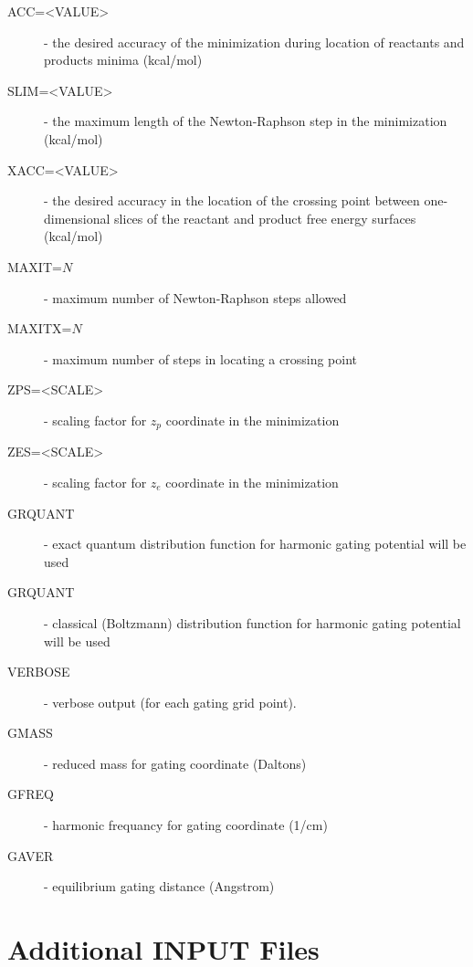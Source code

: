 \documentclass[oneside,11pt,openany]{book}
\newcommand{\tw}{\ttfamily}
\begin{document}
\begin{description}
\item[{\tw ACC=<VALUE>}] - the desired accuracy of the minimization
	      during location of reactants and products
	      minima (kcal/mol)

\item[{\tw SLIM=<VALUE>}] - the maximum length of the Newton-Raphson step
	       in the minimization (kcal/mol)

\item[{\tw XACC=<VALUE>}] - the desired accuracy in the location
	       of the crossing point between one-dimensional
	       slices of the reactant and product free
	       energy surfaces (kcal/mol)

\item[{\tw MAXIT=$N$}] - maximum number of Newton-Raphson steps allowed

\item[{\tw MAXITX=$N$}] - maximum number of steps in locating a crossing point

\item[{\tw ZPS=<SCALE>}] - scaling factor for $z_p$ coordinate in the
                           minimization

\item[{\tw ZES=<SCALE>}] - scaling factor for $z_e$ coordinate in the
                           minimization

\item[{\tw GRQUANT}] - exact quantum distribution function for harmonic gating
                       potential will be used

\item[{\tw GRQUANT}] - classical (Boltzmann) distribution function for harmonic gating
                       potential will be used

\item[{\tw VERBOSE}] - verbose output (for each gating grid point).

\item[{\tw GMASS}] - reduced mass for gating coordinate (Daltons)

\item[{\tw GFREQ}] - harmonic frequancy for gating coordinate (1/cm)

\item[{\tw GAVER}] - equilibrium gating distance (Angstrom)
%
\end{description}

\section{Additional INPUT Files}
%
\end{document}
